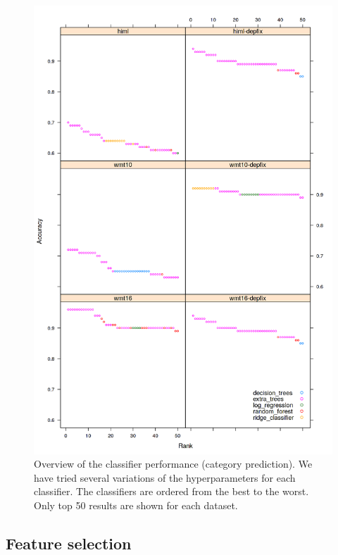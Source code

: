 \begin{figure}
\centering
  \includegraphics[scale=0.7]{cats-class}
  \caption{
    Overview of the classifier performance (category prediction).
We have tried several variations of the hyperparameters
for each classifier. The classifiers are ordered from the best to the worst. Only top 50 results
are shown for each dataset.
}
  \label{cats-draft}
\end{figure}

\subsection{Feature selection}

